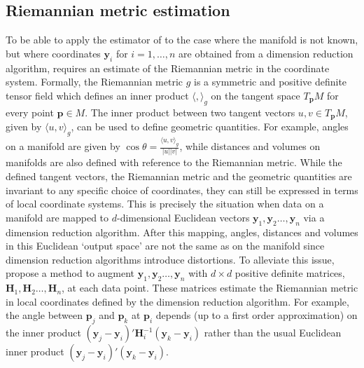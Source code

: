 \documentclass[11pt,a4paper,]{article}
\begin{document}
\hypertarget{MetLearn}{%
\subsection{Riemannian metric estimation}\label{MetLearn}}

To be able to apply the estimator of \textcite{Pelletier2005-vu} to the case where the manifold is not known, but where coordinates \(\pmb{y}_i\) for \(i=1,\dots,n\) are obtained from a dimension reduction algorithm, requires an estimate of the Riemannian metric in the coordinate system. Formally, the Riemannian metric \(g\) is a symmetric and positive definite tensor field which defines an inner product \(\langle,\rangle_g\) on the tangent space \(T_{\pmb{p}} M\) for every point \(\pmb{p} \in M\). The inner product between two tangent vectors \(u,v \in T_{\pmb{p}}M\), given by \(\langle u,v \rangle_g\), can be used to define geometric quantities. For example, angles on a manifold are given by \(\cos{\theta}=\frac{\langle u,v \rangle_g}{|u| |v|}\), while distances and volumes on manifolds are also defined with reference to the Riemannian metric. While the defined tangent vectors, the Riemannian metric and the geometric quantities are invariant to any specific choice of coordinates, they can still be expressed in terms of local coordinate systems. This is precisely the situation when data on a manifold are mapped to \(d\)-dimensional Euclidean vectors \(\pmb{y}_1,\pmb{y}_2\dots,\pmb{y}_n\) via a dimension reduction algorithm. After this mapping, angles, distances and volumes in this Euclidean `output space' are not the same as on the manifold since dimension reduction algorithms introduce distortions. To alleviate this issue, \textcite{Perrault-Joncas2013-pq} propose a method to augment \(\pmb{y}_1,\pmb{y}_2\dots,\pmb{y}_n\) with \(d\times d\) positive definite matrices, \(\pmb{H}_1,\pmb{H}_2\dots,\pmb{H}_n\), at each data point. These matrices estimate the Riemannian metric in local coordinates defined by the dimension reduction algorithm. For example, the angle between \(\pmb{p}_j\) and \(\pmb{p}_k\) at \(\pmb{p}_i\) depends (up to a first order approximation) on the inner product \((\pmb{y}_j-\pmb{y}_i)'\pmb{H}^{-1}_i(\pmb{y}_k-\pmb{y}_i)\) rather than the usual Euclidean inner product \((\pmb{y}_j-\pmb{y}_i)'(\pmb{y}_k-\pmb{y}_i)\).
\end{document}
